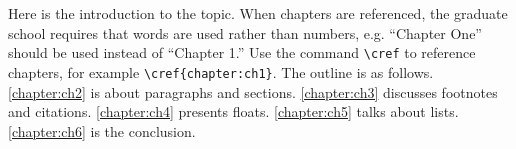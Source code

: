 Here is the introduction to the topic.
When chapters are referenced, the graduate school requires that words are used rather than numbers, e.g. ``Chapter One'' should be used instead of ``Chapter 1.''
Use the command \verb|\cref| to reference chapters, for example \verb|\cref{chapter:ch1}|.
The outline is as follows.
\cref{chapter:ch2} is about paragraphs and sections.
\cref{chapter:ch3} discusses footnotes and citations.
\cref{chapter:ch4} presents floats.
\cref{chapter:ch5} talks about lists.
\cref{chapter:ch6} is the conclusion.

